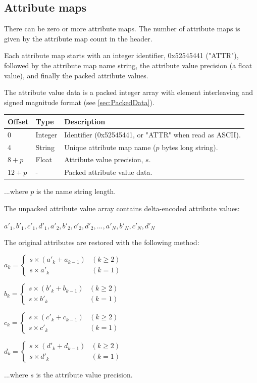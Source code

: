 \subsection{Attribute maps}
There can be zero or more attribute maps. The number of attribute maps is given by the
attribute map count in the header.

Each attribute map starts with an integer identifier, 0x52545441 ("ATTR"), followed
by the attribute map name string, the attribute value precision (a float value), and
finally the packed attribute values.

The attribute value data is a packed integer array with element interleaving
and signed magnitude format (see \ref{sec:PackedData}).

\begin{tabular}{|l|l|l|}\hline
\textbf{Offset} &  \textbf{Type} & \textbf{Description}\\ \hline
0 & Integer & Identifier (0x52545441, or "ATTR" when read as ASCII).\\ \hline
4 & String & Unique attribute map name ($p$ bytes long string).\\ \hline
$8+p$ & Float & Attribute value precision, $s$.\\ \hline
$12+p$ & - & Packed attribute value data.\\ \hline
\end{tabular}

...where $p$ is the name string length.

The unpacked attribute value array contains delta-encoded attribute values:

$a'_1, b'_1, c'_1, d'_1, a'_2, b'_2, c'_2, d'_2, ..., a'_N, b'_N, c'_N, d'_N$

The original attributes are restored with the following method:

$a_k = \begin{cases}
s \times (a'_k + a_{k-1}) & (k \geq 2)\\
s \times a'_k & (k = 1)
\end{cases}$

$b_k = \begin{cases}
s \times (b'_k + b_{k-1}) & (k \geq 2)\\
s \times b'_k & (k = 1)
\end{cases}$

$c_k = \begin{cases}
s \times (c'_k + c_{k-1}) & (k \geq 2)\\
s \times c'_k & (k = 1)
\end{cases}$

$d_k = \begin{cases}
s \times (d'_k + d_{k-1}) & (k \geq 2)\\
s \times d'_k & (k = 1)
\end{cases}$

...where $s$ is the attribute value precision.


